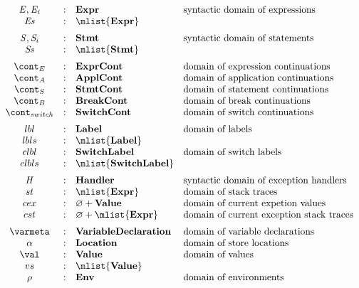 \documentclass[a4paper,oneside]{article}
\renewcommand{\emptyset}{\varnothing}
\begin{document}
\newcommand{\dclass}{\mathbf{Class}}
\newcommand{\dformals}{\mathbf{Formals}}
\[
  \begin{array}{ccll}
    \expr, \expri{i}
    & : & \dexpr & \text{syntactic domain of expressions}\\
    \exprs
    & : & \mlist{\dexpr}\\[2mm]

    \stmt, \stmti{i}
    & : & \dstmt & \text{syntactic domain of statements}\\
    \stmts
    & : & \mlist{\dstmt}  & \text{}\\[2mm]

    \econt
    & : & \decont & \text{domain of expression continuations}\\
    \acont
    & : & \dacont & \text{domain of application continuations}\\
    \scont
    & : & \dscont & \text{domain of statement continuations}\\
    \bcont
    & : & \dbcont & \text{domain of break continuations}\\
    \switchcont
    & : & \dswitchcont & \text{domain of switch continuations}\\[2mm]

    \lbl & : & \dlbl & \text{domain of labels}\\
    \lbls & : & \mlist{\dlbl} \\
    \clbl & : & \dclbl & \text{domain of switch labels}\\
    \clbls & : & \mlist{\dclbl} \\[2mm]

    \handler
    & : & \dhandler & \text{syntactic domain of exception handlers} \\
    \strace
    & : & \mlist{\dexpr} & \text{domain of stack traces}\\
    \cex
    & : &  \emptyset + \dval & \text{domain of current expetion values}\\
    \cstrace
    & : & \emptyset + \mlist{\dexpr} & \text{domain of current exception stack traces}\\[2mm]

    \varmeta
    & : & \dvardecl & \text{domain of variable declarations}\\
    \loc
    & : & \dlocation & \text{domain of store locations}\\
    \val
    & : & \dval & \text{domain of values}\\
    \vals
    & : & \mlist{\dval}\\
    \env
    & : & \denv & \text{domain of environments}\\[2mm]
  \end{array}
\]
\end{document}
